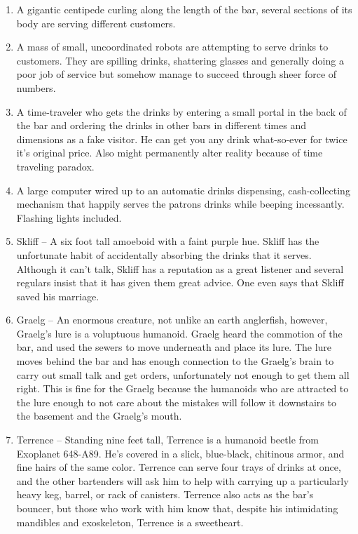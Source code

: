 \documentclass{article}
\begin{document}
\title{\vspace{-0.5cm}{\Huge 100 Unusual SciFi bartender} \vspace{-1cm}}

\date{}

\maketitle

\begin{enumerate}
	\item A gigantic centipede curling along the length of the bar, several sections of its body are serving different customers.
	\item A mass of small, uncoordinated robots are attempting to serve drinks to customers. They are spilling drinks, shattering glasses and generally doing a poor job of service but somehow manage to succeed through sheer force of numbers.
	\item A time-traveler who gets the drinks by entering a small portal in the back of the bar and ordering the drinks in other bars in different times and dimensions as a fake visitor. He can get you any drink what-so-ever for twice it's original price. Also might permanently alter reality because of time traveling paradox.
	\item A large computer wired up to an automatic drinks dispensing, cash-collecting mechanism that happily serves the patrons drinks while beeping incessantly. Flashing lights included.
	\item Skliff – A six foot tall amoeboid with a faint purple hue. Skliff has the unfortunate habit of accidentally absorbing the drinks that it serves. Although it can't talk, Skliff has a reputation as a great listener and several regulars insist that it has given them great advice. One even says that Skliff saved his marriage.
	\item Graelg – An enormous creature, not unlike an earth anglerfish, however, Graelg's lure is a voluptuous humanoid. Graelg heard the commotion of the bar, and used the sewers to move underneath and place its lure. The lure moves behind the bar and has enough connection to the Graelg's brain to carry out small talk and get orders, unfortunately not enough to get them all right. This is fine for the Graelg because the humanoids who are attracted to the lure enough to not care about the mistakes will follow it downstairs to the basement and the Graelg's mouth.
	\item Terrence – Standing nine feet tall, Terrence is a humanoid beetle from Exoplanet 648-A89. He's covered in a slick, blue-black, chitinous armor, and fine hairs of the same color. Terrence can serve four trays of drinks at once, and the other bartenders will ask him to help with carrying up a particularly heavy keg, barrel, or rack of canisters. Terrence also acts as the bar's bouncer, but those who work with him know that, despite his intimidating mandibles and exoskeleton, Terrence is a sweetheart.

\end{enumerate}
\end{document}
